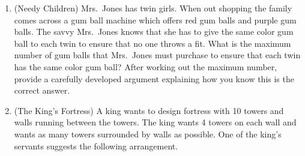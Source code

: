 \documentclass[12 pt]{article}
\theoremstyle{definition}
\theoremstyle{plain}
\theoremstyle{mytheorem}
\theoremstyle{myexample}
\theoremstyle{mydefinition}
\begin{document}
\begin{enumerate}
\item (Needy Children)  Mrs.~Jones has twin girls.  When out shopping the family comes across a gum ball machine which offers red gum balls and purple gum balls.  The savvy Mrs.~Jones knows that she has to give the same color gum ball to each twin to ensure that no one throws a fit.  What is the maximum number of gum balls that Mrs.~Jones must purchase to ensure that each twin has the same color gum ball?  After working out the maximum number, provide a carefully developed argument explaining how you know this is the correct answer.


\item (The King's Fortress)  A king wants to design fortress with 10 towers and walls running between the towers.  The king wants 4 towers on each wall and wants as many towers surrounded by walls as possible.  One of the king's servants suggests the following arrangement.
\begin{center}
\end{center}


\end{enumerate}
\end{document}
